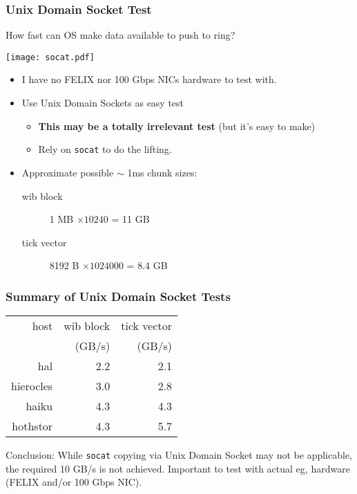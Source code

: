\documentclass[xcolor=dvipsnames]{beamer}
\begin{document}
\begin{frame}[fragile]
  \frametitle{Unix Domain Socket Test}
  How fast can OS make data available to push to ring?
  \begin{center}
    \texttt{[image: socat.pdf]}    
  \end{center}

  \begin{itemize}
  \item I have no FELIX nor 100 Gbps NICs hardware to test with.
  \item Use Unix Domain Sockets as easy test
    \begin{itemize}\footnotesize
    \item  \textbf{This may be a totally irrelevant test} (but it's easy to make)
    \item Rely on \texttt{socat} to do the lifting.
    \end{itemize}
  \item Approximate possible $\sim$ 1ms chunk sizes:
    \begin{description}
    \item[wib block] 1 MB $\times 10240$ = 11 GB 
    \item[tick vector] 8192 B $\times 1024000$ = 8.4 GB
    \end{description}
  \end{itemize}
  
\end{frame}

\begin{frame}[fragile]
  \frametitle{Summary of Unix Domain Socket Tests}
  
  \begin{center}
    \begin{tabular}[h]{|r|r|r|}
      \hline
      host & wib block & tick vector \\
           & (GB/s) & (GB/s) \\
      \hline
      hal & 2.2 & 2.1 \\
      hierocles & 3.0 & 2.8 \\
      haiku & 4.3 & 4.3  \\
      hothstor & 4.3 & 5.7 \\
      \hline
    \end{tabular}
  \end{center}
  Conclusion: While \texttt{socat} copying via Unix Domain Socket may
  not be applicable, the required 10 GB/s is not achieved.  Important to
  test with actual eg, hardware (FELIX and/or 100 Gbps NIC).
\end{frame}
\end{document}
